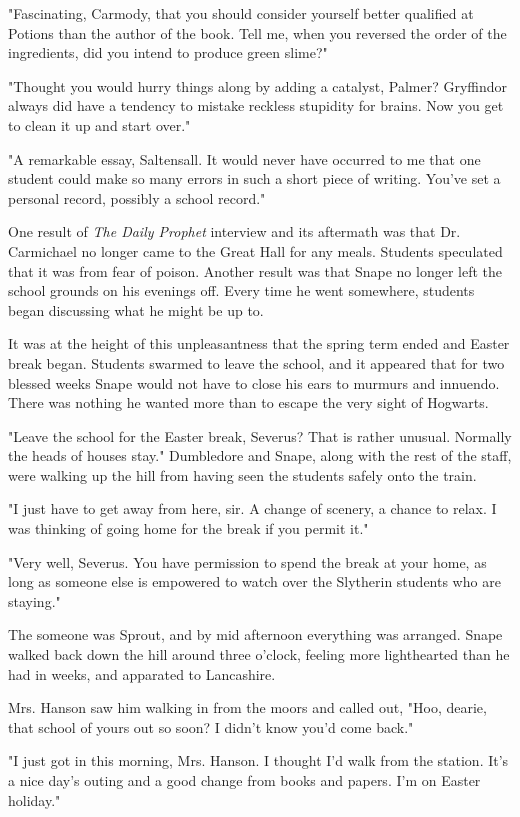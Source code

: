 "Fascinating, Carmody, that you should consider yourself better qualified at Potions than the author of the book. Tell me, when you reversed the order of the ingredients, did you intend to produce green slime?"

"Thought you would hurry things along by adding a catalyst, Palmer? Gryffindor always did have a tendency to mistake reckless stupidity for brains. Now you get to clean it up and start over."

"A remarkable essay, Saltensall. It would never have occurred to me that one student could make so many errors in such a short piece of writing. You've set a personal record, possibly a school record."

One result of \emph{The Daily Prophet} interview and its aftermath was that Dr. Carmichael no longer came to the Great Hall for any meals. Students speculated that it was from fear of poison. Another result was that Snape no longer left the school grounds on his evenings off. Every time he went somewhere, students began discussing what he might be up to.

It was at the height of this unpleasantness that the spring term ended and Easter break began. Students swarmed to leave the school, and it appeared that for two blessed weeks Snape would not have to close his ears to murmurs and innuendo. There was nothing he wanted more than to escape the very sight of Hogwarts.

"Leave the school for the Easter break, Severus? That is rather unusual. Normally the heads of houses stay." Dumbledore and Snape, along with the rest of the staff, were walking up the hill from having seen the students safely onto the train.

"I just have to get away from here, sir. A change of scenery, a chance to relax. I was thinking of going home for the break if you permit it."

"Very well, Severus. You have permission to spend the break at your home, as long as someone else is empowered to watch over the Slytherin students who are staying."

The someone was Sprout, and by mid afternoon everything was arranged. Snape walked back down the hill around three o'clock, feeling more lighthearted than he had in weeks, and apparated to Lancashire.

Mrs. Hanson saw him walking in from the moors and called out, "Hoo, dearie, that school of yours out so soon? I didn't know you'd come back."

"I just got in this morning, Mrs. Hanson. I thought I'd walk from the station. It's a nice day's outing and a good change from books and papers. I'm on Easter holiday."

